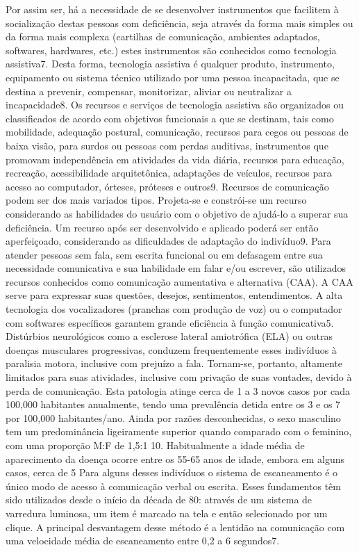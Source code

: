 \documentclass[twoside]{article}
\begin{document}
\begin{multicols}{2}
Por assim ser, há a necessidade de se desenvolver instrumentos que facilitem à socialização destas pessoas com deficiência, seja através da forma mais simples ou da forma mais complexa (cartilhas de comunicação, ambientes adaptados, softwares, hardwares, etc.) estes instrumentos são conhecidos como tecnologia assistiva7.
Desta forma, tecnologia assistiva é qualquer produto, instrumento, equipamento ou sistema técnico utilizado por uma pessoa incapacitada, que se destina a prevenir, compensar, monitorizar, aliviar ou neutralizar a incapacidade8.
Os recursos e serviços de tecnologia assistiva são organizados ou classificados de acordo com objetivos funcionais a que se destinam, tais como mobilidade, adequação postural, comunicação, recursos para cegos ou pessoas de baixa visão, para surdos ou pessoas com perdas auditivas, instrumentos que promovam independência em atividades da vida diária, recursos para educação, recreação, acessibilidade arquitetônica, adaptações de veículos, recursos para acesso ao computador, órteses, próteses e outros9.
Recursos de comunicação podem ser dos mais variados tipos. Projeta-se e constrói-se um recurso considerando as habilidades do usuário com o objetivo de ajudá-lo a superar sua deficiência. Um recurso após ser desenvolvido e aplicado poderá ser então aperfeiçoado, considerando as dificuldades de adaptação do indivíduo9. 
Para atender pessoas sem fala, sem escrita funcional ou em defasagem entre sua necessidade comunicativa e sua habilidade em falar e/ou escrever, são utilizados recursos conhecidos como comunicação aumentativa e alternativa (CAA). A CAA serve para expressar suas questões, desejos, sentimentos, entendimentos. A alta tecnologia dos vocalizadores (pranchas com produção de voz) ou o computador com softwares específicos garantem grande eficiência à função comunicativa5.
Distúrbios neurológicos como a esclerose lateral amiotrófica (ELA) ou outras doenças musculares progressivas, conduzem frequentemente esses indivíduos à paralisia motora, inclusive com prejuízo a fala. Tornam-se, portanto, altamente limitados para suas atividades, inclusive com privação de suas vontades, devido à perda de comunicação.
Esta patologia atinge cerca de 1 a 3 novos casos por cada 100,000 habitantes anualmente, tendo uma prevalência detida entre os 3 e os 7 por 100,000 habitantes/ano. Ainda por razões desconhecidas, o sexo masculino tem um predominância ligeiramente superior quando comparado com o feminino, com uma proporção M:F de 1,5:1 10. Habitualmente a idade média de aparecimento da doença ocorre entre os 55-65 anos de idade, embora em  alguns casos, cerca de 5%
Para alguns desses indivíduos o sistema de escaneamento é o único modo de acesso à comunicação verbal ou escrita. Esses fundamentos têm sido utilizados desde o início da década de 80: através de um sistema de varredura luminosa, um item é marcado na tela e então selecionado por um clique. A principal desvantagem desse método é a lentidão na comunicação com uma velocidade média de escaneamento entre 0,2 a 6 segundos7.


\end{multicols}
\end{document}
